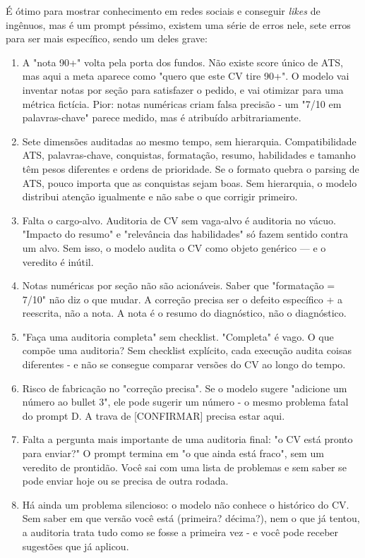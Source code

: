 \documentclass[11pt, a4paper]{article}
\begin{document}
É ótimo para mostrar conhecimento em redes sociais e conseguir \textit{likes} de ingênuos, mas é um prompt péssimo, existem uma série de erros nele, sete erros para ser mais específico, sendo um deles grave:
\begin{enumerate}
	\item A "nota 90+" volta pela porta dos fundos. Não existe score único de ATS, mas aqui a meta aparece como "quero que este CV tire 90+". O modelo vai inventar notas por seção para satisfazer o pedido, e vai otimizar para uma métrica fictícia. Pior: notas numéricas criam falsa precisão - um "7/10 em palavras-chave" parece medido, mas é atribuído arbitrariamente.
	\item Sete dimensões auditadas ao mesmo tempo, sem hierarquia. Compatibilidade ATS, palavras-chave, conquistas, formatação, resumo, habilidades e tamanho têm pesos diferentes e ordens de prioridade. Se o formato quebra o parsing de ATS, pouco importa que as conquistas sejam boas. Sem hierarquia, o modelo distribui atenção igualmente e não sabe o que corrigir primeiro.
	\item Falta o cargo-alvo. Auditoria de CV sem vaga-alvo é auditoria no vácuo. "Impacto do resumo" e "relevância das habilidades" só fazem sentido contra um alvo. Sem isso, o modelo audita o CV como objeto genérico — e o veredito é inútil.
	\item Notas numéricas por seção não são acionáveis. Saber que "formatação = 7/10" não diz o que mudar. A correção precisa ser o defeito específico + a reescrita, não a nota. A nota é o resumo do diagnóstico, não o diagnóstico.
	\item "Faça uma auditoria completa" sem checklist. "Completa" é vago. O que compõe uma auditoria? Sem checklist explícito, cada execução audita coisas diferentes - e não se consegue comparar versões do CV ao longo do tempo.
	\item Risco de fabricação no "correção precisa". Se o modelo sugere "adicione um número ao bullet 3", ele pode sugerir um número - o mesmo problema fatal do prompt D. A trava de [CONFIRMAR] precisa estar aqui.
	\item Falta a pergunta mais importante de uma auditoria final: "o CV está pronto para enviar?" O prompt termina em "o que ainda está fraco", sem um veredito de prontidão. Você sai com uma lista de problemas e sem saber se pode enviar hoje ou se precisa de outra rodada.
	\item Há ainda um problema silencioso: o modelo não conhece o histórico do CV. Sem saber em que versão você está (primeira? décima?), nem o que já tentou, a auditoria trata tudo como se fosse a primeira vez - e você pode receber sugestões que já aplicou.
\end{enumerate}
\end{document}
